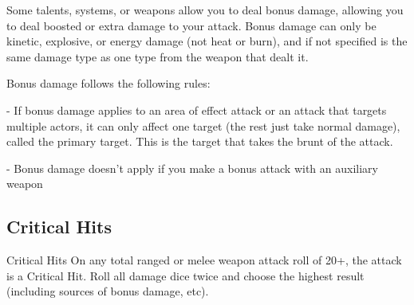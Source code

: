 Some talents, systems, or weapons allow you to deal bonus damage, allowing you to deal  
boosted or extra damage to your attack. Bonus damage can only be kinetic, explosive, or energy  
damage (not heat or burn), and if not specified is the same damage type as one type from the  
weapon that dealt it.
 

Bonus damage follows the following rules:
 
         	- If bonus damage applies to an area of effect attack or an attack that targets multiple  
         actors, it can only affect one target (the rest just take normal damage), called the primary  
         target. This is the target that takes the brunt of the attack.
 
         	- Bonus damage doesn’t apply if you make a bonus attack with an auxiliary weapon  

\subsection{Critical Hits}
                                                Critical Hits  
On any total ranged or melee weapon attack roll of 20+, the attack is a Critical Hit. Roll all  
damage dice twice and choose the highest result (including sources of bonus damage, etc).
 
